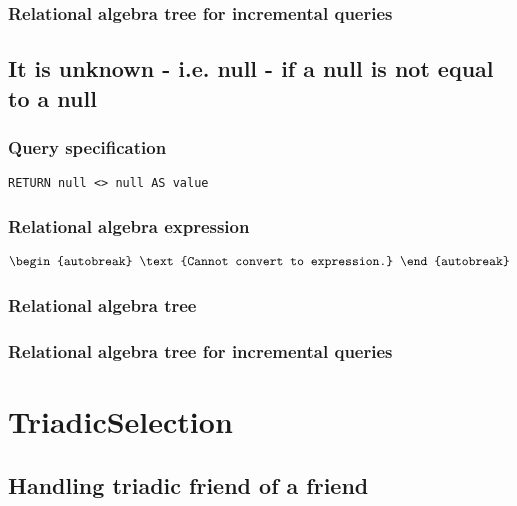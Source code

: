 \subsubsection*{Relational algebra tree for incremental queries}


\subsection{It is unknown - i.e. null - if a null is not equal to a null}

\subsubsection*{Query specification}

\begin{lstlisting}
RETURN null <> null AS value
\end{lstlisting}

\subsubsection*{Relational algebra expression}

\begin{align*}
\begin{autobreak}
\text{Cannot convert to expression.}
\end{autobreak}
\end{align*}

\subsubsection*{Relational algebra tree}


\subsubsection*{Relational algebra tree for incremental queries}

\section{TriadicSelection}


\subsection{Handling triadic friend of a friend}

